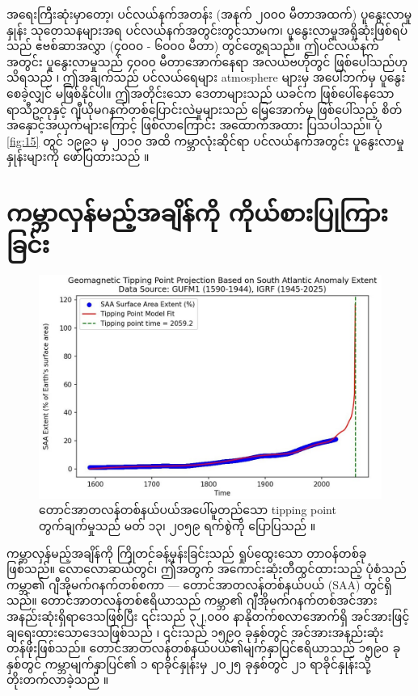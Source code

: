 \documentclass[10pt,twocolumn,letterpaper]{article}
\begin{document}
အရေးကြီးဆုံးမှာတော့၊ ပင်လယ်နက်အတန်း (အနက် ၂၀၀၀ မီတာအထက်) ပူနွေးလာမှုနှုန်း သုတေသနများအရ ပင်လယ်နက်အတွင်းတွင်သာမက၊ ပူနွေးလာမှုအရှိဆုံးဖြစ်ရပ်သည် ဧဗစ်ဆာအလွှာ (၄၀၀၀ - ၆၀၀၀ မီတာ) တွင်တွေ့ရသည်။ ဤပင်လယ်နက်အတွင်း ပူနွေးလာမှုသည် ၄၀၀၀ မီတာအောက်နေရာ အလယ်ဗဟိုတွင် ဖြစ်ပေါ်သည်ဟု သိရသည် \cite{132,129}၊ ဤအချက်သည် ပင်လယ်ရေများ atmosphere များမှ အပေါ်ဘက်မှ ပူနွေးစေခဲ့လျှင် မဖြစ်နိုင်ပါ။ ဤအတိုင်းသော ဒေတာများသည် ယခင်က ဖြစ်ပေါ်နေသော ရာသီဥတုနှင့် ဂျီယိုမဂနက်တစ်ပြောင်းလဲမှုများသည် မြေအောက်မှ ဖြစ်ပေါ်သည့် စိတ်အနှောင့်အယှက်များကြောင့် ဖြစ်လာကြောင်း အထောက်အထား ပြသပါသည်။ ပုံ \ref{fig:15} တွင် ၁၉၉၁ မှ ၂၀၁၀ အထိ ကမ္ဘာလုံးဆိုင်ရာ ပင်လယ်နက်အတွင်း ပူနွေးလာမှုနှုန်းများကို ဖော်ပြထားသည် \cite{132}။
\section{ကမ္ဘာလှန်မည့်အချိန်ကို ကိုယ်စားပြုကြားခြင်း}

\begin{figure}[b]
\begin{center}
   \includegraphics[width=1\linewidth]{saa-crop.jpeg}
\end{center}
   \caption{တောင်အာတလန်တစ်နယ်ပယ်အပေါ်မူတည်သော tipping point တွက်ချက်မှုသည် မတ် ၁၃၊ ၂၀၅၉ ရက်စွဲကို ပြောပြသည် \cite{125,126}။}
\label{fig:16}
\label{fig:onecol}
\end{figure}

ကမ္ဘာလှန်မည့်အချိန်ကို ကြိုတင်ခန့်မှန်းခြင်းသည် ရှုပ်ထွေးသော တာဝန်တစ်ခုဖြစ်သည်။ လောလောဆယ်တွင်၊ ဤအတွက် အကောင်းဆုံးတီထွင်ထားသည့် ပုံစံသည် ကမ္ဘာ၏ ဂျီအိုမက်ဂနက်တစ်စကာ — တောင်အာတလန်တစ်နယ်ပယ် (SAA) တွင်ရှိသည်။ တောင်အာတလန်တစ်ဧရိယာသည် ကမ္ဘာ၏ ဂျီအိုမက်ဂနက်တစ်အင်အား အနည်းဆုံးရှိရာဒေသဖြစ်ပြီး ၎င်းသည် ၃၂,၀၀၀ နာနိုတက်စလာအောက်ရှိ အင်အားဖြင့် ချရေးထားသောဒေသဖြစ်သည် \cite{135}၊ ၎င်းသည် ၁၅၉၀ ခုနှစ်တွင် အင်အားအနည်းဆုံးတန်ဖိုးဖြစ်သည်။ တောင်အာတလန်တစ်နယ်ပယ်၏မျက်နှာပြင်ဧရိယာသည် ၁၅၉၀ ခုနှစ်တွင် ကမ္ဘာမျက်နှာပြင်၏ ၁ ရာခိုင်နှုန်းမှ ၂၀၂၅ ခုနှစ်တွင် ၂၁ ရာခိုင်နှုန်းသို့ တိုးတက်လာခဲ့သည် \cite{136}။
\end{document}
